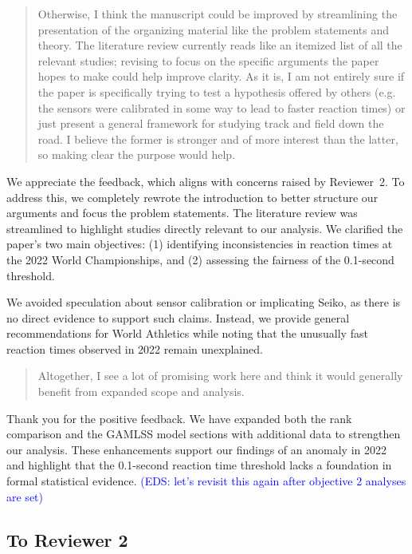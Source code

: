 \documentclass[12pt]{article}
\newcommand{\eds}[1]{\textcolor{blue}{(EDS: #1)}}
\newenvironment{comment}%
{\begin{quotation}\noindent\small\it\color{darkblue}\ignorespaces%
}{\end{quotation}}
\begin{document}
\begin{comment}
Otherwise, I think the manuscript could be improved by streamlining the
presentation of the organizing material like the problem statements and theory.
The literature review currently reads like an itemized list of all the relevant
studies; revising to focus on the specific arguments the paper hopes to make
could help improve clarity. As it is, I am not entirely sure if the paper is
specifically trying to test a hypothesis offered by others (e.g. the sensors
were calibrated in some way to lead to faster reaction times) or just present a
general framework for studying track and field down the road. I believe the
former is stronger and of more interest than the latter, so making clear the
purpose would help.
\end{comment}  

We appreciate the feedback, which aligns with concerns raised by
Reviewer~2. To address this, we completely rewrote the introduction to
better structure our arguments and focus the problem statements. The
literature review was streamlined to highlight studies directly
relevant to our analysis. We clarified the paper’s two main
objectives: (1) identifying inconsistencies in reaction times at the
2022 World Championships, and (2) assessing the fairness of the
0.1-second threshold.


We avoided speculation about sensor calibration or implicating Seiko,
as there is no direct evidence to support such claims. Instead, we
provide general recommendations for World Athletics while noting that
the unusually fast reaction times observed in 2022 remain unexplained.


\begin{comment}
Altogether, I see a lot of promising work here and think it would generally
benefit from expanded scope and analysis.
\end{comment}

Thank you for the positive feedback. We have expanded both the rank
comparison and the GAMLSS model sections with additional data to
strengthen our analysis. These enhancements support our findings of an
anomaly in 2022 and highlight that the 0.1-second reaction time
threshold lacks a foundation in formal statistical evidence.
\eds{let's revisit this again after objective 2 analyses are set}


\subsection*{To Reviewer 2}
\end{document}
